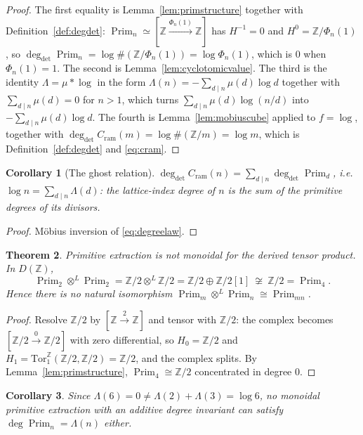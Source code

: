 \documentclass[11pt]{amsart}
\newtheorem{theorem}{Theorem}[section]
\newtheorem{corollary}[theorem]{Corollary}
\theoremstyle{definition}
\theoremstyle{remark}
\newcommand{\Z}{\mathbb Z}
\newcommand{\Prim}{\operatorname{Prim}}
\newcommand{\degdet}{\operatorname{deg}_{\mathrm{det}}}
\begin{document}
\begin{proof}
The first equality is Lemma~\ref{lem:primstructure} together with
Definition~\ref{def:degdet}: $\Prim_n\simeq[\Z\xrightarrow{\Phi_n(1)}\Z]$ has
$H^{-1}=0$ and $H^0=\Z/\Phi_n(1)$, so
$\degdet\Prim_n=\log\#(\Z/\Phi_n(1))=\log\Phi_n(1)$, which is $0$ when
$\Phi_n(1)=1$. The second is Lemma~\ref{lem:cyclotomicvalue}. The third is the
identity $\Lambda=\mu*\log$ in the form $\Lambda(n)=-\sum_{d\mid n}\mu(d)\log
d$ together with $\sum_{d\mid n}\mu(d)=0$ for $n>1$, which turns
$\sum_{d\mid n}\mu(d)\log(n/d)$ into $-\sum_{d\mid n}\mu(d)\log d$. The fourth
is Lemma~\ref{lem:mobiuscube} applied to $f=\log$, together with
$\degdet C_{\mathrm{ram}}(m)=\log\#(\Z/m)=\log m$, which is
Definition~\ref{def:degdet} and \eqref{eq:cram}.
\end{proof}

\begin{corollary}[The ghost relation]\label{cor:ghost}
$\degdet C_{\mathrm{ram}}(n)=\sum_{d\mid n}\degdet\Prim_d$, i.e.
$\log n=\sum_{d\mid n}\Lambda(d)$: the lattice-index degree of $n$ is the sum
of the primitive degrees of its divisors.
\end{corollary}

\begin{proof}
M\"obius inversion of \eqref{eq:degreelaw}.
\end{proof}

\begin{theorem}\label{thm:notmonoidal}
Primitive extraction is not monoidal for the derived tensor product. In
$D(\Z)$,
\[
  \Prim_2\otimes^L\Prim_2=\Z/2\otimes^L\Z/2=\Z/2\oplus\Z/2[1]
   \ \not\cong\ \Z/2=\Prim_4 .
\]
Hence there is no natural isomorphism $\Prim_m\otimes^L\Prim_n
\cong\Prim_{mn}$.
\end{theorem}

\begin{proof}
Resolve $\Z/2$ by $[\Z\xrightarrow{2}\Z]$ and tensor with $\Z/2$: the complex
becomes $[\Z/2\xrightarrow{0}\Z/2]$ with zero differential, so $H_0=\Z/2$ and
$H_1=\mathrm{Tor}_1^\Z(\Z/2,\Z/2)=\Z/2$, and the complex splits. By
Lemma~\ref{lem:primstructure}, $\Prim_4\cong\Z/2$ concentrated in degree $0$.
\end{proof}

\begin{corollary}\label{cor:notadditive}
Since $\Lambda(6)=0\ne\Lambda(2)+\Lambda(3)=\log6$, no monoidal primitive
extraction with an additive degree invariant can satisfy
$\deg\Prim_n=\Lambda(n)$ either.
\end{corollary}
\end{document}
